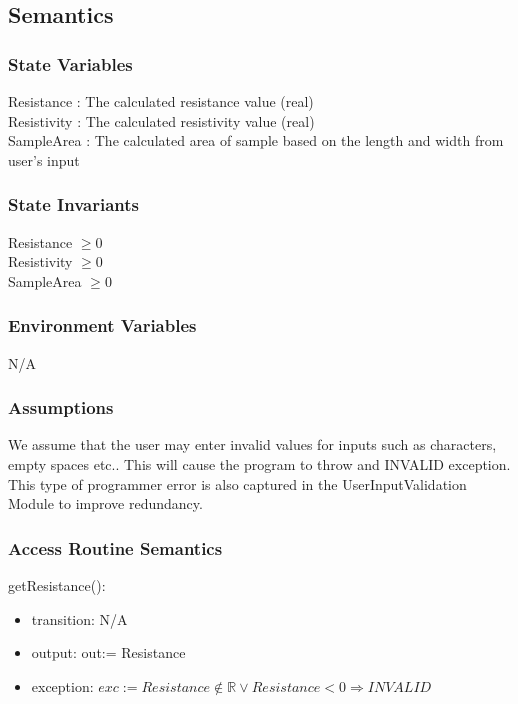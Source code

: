 \documentclass[12pt, titlepage]{article}
\begin{document}
\subsection{Semantics}

\subsubsection{State Variables}

Resistance : The calculated resistance value (real)\\
Resistivity : The calculated resistivity value (real) \\
SampleArea : The calculated area of sample based on the length and width from user's input

\subsubsection{State Invariants}

Resistance $\geq 0$ \\
Resistivity $\geq 0$ \\
SampleArea $\geq 0$

\subsubsection{Environment Variables}

N/A

\subsubsection{Assumptions}

We assume that the user may enter invalid values for inputs such as characters, empty spaces etc..
This will cause the program to throw and INVALID exception. This type of programmer error is also 
captured in the UserInputValidation Module to improve redundancy.

\subsubsection{Access Routine Semantics}

\noindent getResistance():
\begin{itemize}
\item transition: N/A
\item output: out:= Resistance
\item exception: $exc:= Resistance \notin \mathbb{R} \lor Resistance < 0  \Rightarrow INVALID$
\end{itemize}
\end{document}
